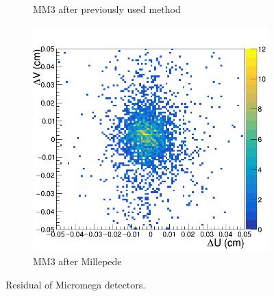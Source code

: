 \begin{figure}[h!]
\begin{subfigure}[l]{.45\textwidth}
   \caption{MM3 after previously used method}
   \label{fig:MX3_after_prev}
 \end{subfigure}
 \begin{subfigure}[r]{.45\textwidth}
   \centering
   \includegraphics[width=\linewidth]{thesis_figures/alignment/Run_3211_after_millepede/square/MX3.png}
   \caption{MM3 after Millepede}
 \end{subfigure}
 \caption{Residual of Micromega detectors.}
\end{figure}


